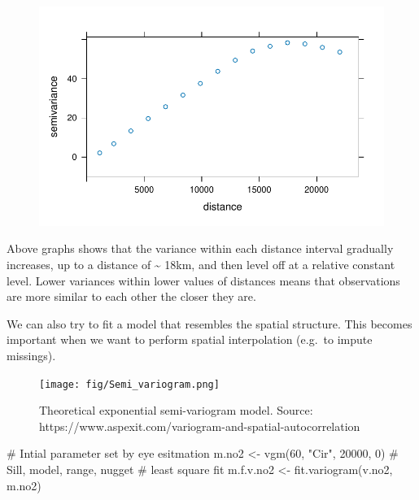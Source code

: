 \documentclass[
  letterpaper,
  DIV=11,
  numbers=noendperiod]{scrreprt}
\newenvironment{Shaded}{\begin{snugshade}}{\end{snugshade}}
\newcommand{\CommentTok}[1]{\textcolor[rgb]{0.37,0.37,0.37}{#1}}
\newcommand{\DecValTok}[1]{\textcolor[rgb]{0.68,0.00,0.00}{#1}}
\newcommand{\FunctionTok}[1]{\textcolor[rgb]{0.28,0.35,0.67}{#1}}
\newcommand{\NormalTok}[1]{\textcolor[rgb]{0.00,0.23,0.31}{#1}}
\newcommand{\OtherTok}[1]{\textcolor[rgb]{0.00,0.23,0.31}{#1}}
\newcommand{\StringTok}[1]{\textcolor[rgb]{0.13,0.47,0.30}{#1}}
\begin{document}
\begin{figure}[H]

{\centering \includegraphics{04_dependence_files/figure-pdf/unnamed-chunk-10-1.pdf}

}

\end{figure}

Above graphs shows that the variance within each distance interval
gradually increases, up to a distance of \textasciitilde{} 18km, and
then level off at a relative constant level. Lower variances within
lower values of distances means that observations are more similar to
each other the closer they are.

We can also try to fit a model that resembles the spatial structure.
This becomes important when we want to perform spatial interpolation
(e.g.~to impute missings).

\begin{figure}

{\centering \texttt{[image: fig/Semi\_variogram.png]}

}

\caption{Theoretical exponential semi-variogram model. Source:
https://www.aspexit.com/variogram-and-spatial-autocorrelation}

\end{figure}

\begin{Shaded}
\begin{Highlighting}[]
\CommentTok{\# Intial parameter set by eye esitmation}
\NormalTok{m.no2 }\OtherTok{\textless{}{-}} \FunctionTok{vgm}\NormalTok{(}\DecValTok{60}\NormalTok{, }\StringTok{"Cir"}\NormalTok{, }\DecValTok{20000}\NormalTok{, }\DecValTok{0}\NormalTok{)  }\CommentTok{\# Sill, model, range, nugget}
\CommentTok{\# least square fit}
\NormalTok{m.f.v.no2 }\OtherTok{\textless{}{-}} \FunctionTok{fit.variogram}\NormalTok{(v.no2, m.no2)}
\end{Highlighting}
\end{Shaded}
\end{document}

